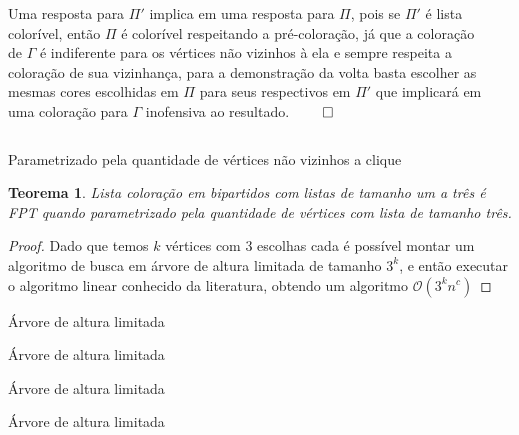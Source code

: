 \documentclass[9pt, compress]{beamer}
\newtheorem{teorema}{Teorema}
\newcommand{\?}{\textcolor{warn}{\textit{?}}}
\begin{document}
     \begin{frame}
       \begin{columns}
        \begin{column}{0.5\textwidth}
          Uma resposta para $\Pi'$ implica em uma resposta para $\Pi$, pois se $\Pi'$ é lista colorível, então $\Pi$ é colorível respeitando a pré-coloração, já que a coloração de $\Gamma$ é indiferente para os vértices não vizinhos à ela e sempre respeita a coloração de sua vizinhança, para a demonstração da volta basta escolher as mesmas cores escolhidas em $\Pi$ para seus respectivos em $\Pi'$ que implicará em uma coloração para $\Gamma$ inofensiva ao resultado. $\qed$
        \end{column}
        \begin{column}{0.5\textwidth}
        \end{column}
      \end{columns}
     \end{frame}
     \begin{frame}{Parametrizado pela quantidade de vértices não vizinhos a clique}
       
        \begin{teorema}
         Lista coloração em bipartidos com listas de tamanho um a três é FPT quando parametrizado pela quantidade de vértices com lista de tamanho três.
        \end{teorema}
        \begin{proof}
         Dado que temos $k$ vértices com 3 escolhas cada é possível montar um algoritmo de busca em árvore de altura limitada de tamanho $3^k$, e então executar o algoritmo linear conhecido da literatura, obtendo um algoritmo $\mathcal{O}(3^kn^{c})$
\end{proof}
     \end{frame}
     \begin{frame}{Árvore de altura limitada}
       \begin{figure}[H]
        \centering
        \fontsize{4}{10}
        
      \end{figure}
     \end{frame}
     \begin{frame}{Árvore de altura limitada}
       \begin{figure}[H]
        \centering
        \fontsize{4}{10}
        
      \end{figure}
     \end{frame}
     \begin{frame}{Árvore de altura limitada}
       \begin{figure}[H]
        \centering
        \fontsize{4}{10}
        
      \end{figure}
     \end{frame}
     \begin{frame}{Árvore de altura limitada}
       \begin{figure}[H]
        \centering
        \fontsize{4}{10}
        
      \end{figure}
     \end{frame}
\end{document}

